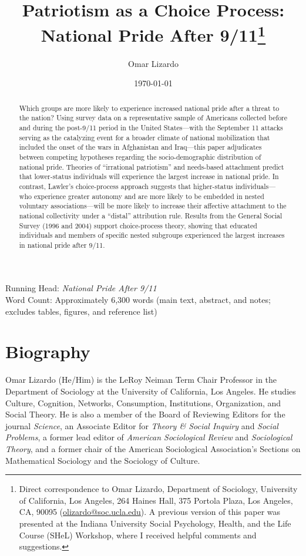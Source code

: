\documentclass[12pt,letterpaper]{article}
\title{Patriotism as a Choice Process: National Pride After 9/11\thanks{Direct correspondence to Omar Lizardo, Department of Sociology, University of California, Los Angeles, 264 Haines Hall, 375 Portola Plaza, Los Angeles, CA, 90095 (\href{mailto:olizardo@soc.ucla.edu}{olizardo@soc.ucla.edu}). A previous version of this paper was presented at the Indiana University Social Psychology, Health, and the Life Course (SHeL) Workshop, where I received helpful comments and suggestions.}}
\author{Omar Lizardo}
\affil{Department of Sociology, University of California, Los Angeles}
\date{\today}
\begin{document}
\maketitle

\begin{center}
Running Head: \textit{National Pride After 9/11}\\
Word Count: Approximately 6,300 words (main text, abstract, and notes; excludes tables, figures, and reference list)
\end{center}

\newpage
\section*{Biography}
Omar Lizardo (He/Him) is the LeRoy Neiman Term Chair Professor in the Department of Sociology at the University of California, Los Angeles. He studies Culture, Cognition, Networks, Consumption, Institutions, Organization, and Social Theory. He is also a member of the Board of Reviewing Editors for the journal \textit{Science}, an Associate Editor for \textit{Theory \& Social Inquiry} and \textit{Social Problems}, a former lead editor of \textit{American Sociological Review} and \textit{Sociological Theory}, and a former chair of the American Sociological Association's Sections on Mathematical Sociology and the Sociology of Culture.

\newpage
\begin{abstract}
Which groups are more likely to experience increased national pride after a threat to the nation? Using survey data on a representative sample of Americans collected before and during the post-9/11 period in the United States---with the September 11 attacks serving as the catalyzing event for a broader climate of national mobilization that included the onset of the wars in Afghanistan and Iraq---this paper adjudicates between competing hypotheses regarding the socio-demographic distribution of national pride. Theories of ``irrational patriotism'' and needs-based attachment predict that lower-status individuals will experience the largest increase in national pride. In contrast, Lawler's choice-process approach suggests that higher-status individuals---who experience greater autonomy and are more likely to be embedded in nested voluntary associations---will be more likely to increase their affective attachment to the national collectivity under a ``distal'' attribution rule. Results from the General Social Survey (1996 and 2004) support choice-process theory, showing that educated individuals and members of specific nested subgroups experienced the largest increases in national pride after 9/11.
\end{abstract}
\end{document}
